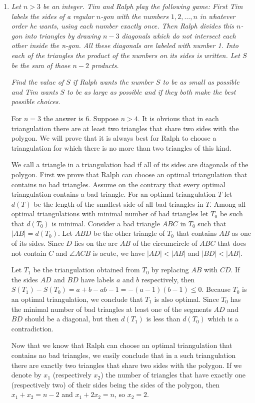\documentclass[a4paper,12pt]{article}
\begin{document}
\begin{enumerate}
	\item 
	\textit{Let $n > 3$ be an integer. Tim and Ralph play the following game: First Tim labels the sides of a regular $n$-gon with the numbers $1, 2, \dotsc, n$ in whatever order he wants, using each number exactly once. Then Ralph divides this $n$-gon into triangles by drawing $n-3$ diagonals which do not intersect each other inside the n-gon. All these diagonals are labeled with number 1. Into each of the triangles the product of the numbers on its sides is written. Let $S$ be the sum of those $n-2$ products.}
	
	\textit{Find the value of $S$ if Ralph wants the number $S$ to be as small as possible and Tim wants $S$ to be as large as possible and if they both make the best possible choices.}
	
	For $n = 3$ the answer is 6. Suppose $n > 4$. It is obvious that in each triangulation there are at least two triangles that share two sides with the polygon. We will prove that it is always best for Ralph to choose a triangulation for which there is no more than two triangles of this kind.
	
	We call a triangle in a triangulation bad if all of its sides are diagonals of the polygon. First we prove that Ralph can choose an optimal triangulation that contains no bad triangles. Assume on the contrary that every optimal triangulation contains a bad triangle. For an optimal triangulation $T$ let $d(T)$ be the length of the smallest side of all bad triangles in $T$. Among all optimal triangulations with minimal number of bad triangles let $T_0$ be such that $d(T_0)$ is minimal. Consider a bad triangle $ABC$ in $T_0$ such that $|AB| = d(T_0)$. Let $ABD$ be the other triangle of $T_0$ that contains $AB$ as one of its sides. Since $D$ lies on the arc $AB$ of the circumcircle of $ABC$ that does not contain $C$ and $\angle ACB$ is acute, we have $|AD| < |AB|$ and $|BD| < |AB|$.
	
	Let $T_1$ be the triangulation obtained from $T_0$ by replacing $AB$ with $CD$. If the sides $AD$ and $BD$ have labels $a$ and $b$ respectively, then $S(T_1)-S(T_0) = a+b-ab-1 = -(a-1)(b-1) \leq 0$. Because $T_0$ is an optimal triangulation, we conclude that $T_1$ is also optimal. Since $T_0$ has the minimal number of bad triangles at least one of the segments $AD$ and $BD$ should be a diagonal, but then $d(T_1)$ is less than $d(T_0)$ which is a contradiction.
	
	Now that we know that Ralph can choose an optimal triangulation that contains no bad triangles, we easily conclude that in a such triangulation there are exactly two triangles that share two sides with the polygon. If we denote by $x_1$ (respectively $x_2$) the number of triangles that have exactly one (respectively two) of their sides being the sides of the polygon, then $x_1 + x_2 = n-2$ and $x_1 + 2x_2 = n$, so $x_2 = 2$.
	

\end{enumerate}
\end{document}
